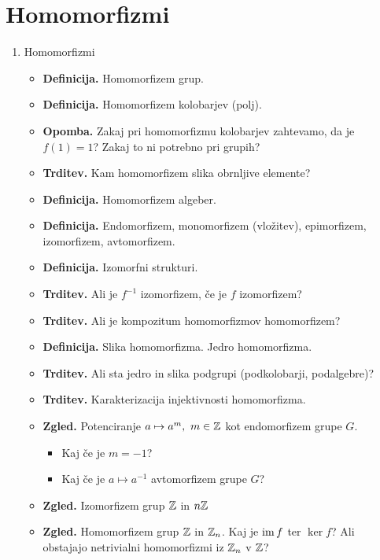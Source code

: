 \section{Homomorfizmi}

\begin{enumerate}
    \item Homomorfizmi
    \begin{itemize}
        \item \textbf{Definicija.} Homomorfizem grup.
        \item \textbf{Definicija.} Homomorfizem kolobarjev (polj).
        \item \textbf{Opomba.} Zakaj pri homomorfizmu kolobarjev zahtevamo, da je \(f(1) = 1\)? Zakaj to ni potrebno pri grupih? 
        \item \textbf{Trditev.} Kam homomorfizem slika obrnljive elemente?
        \item \textbf{Definicija.} Homomorfizem algeber.
        \item \textbf{Definicija.} Endomorfizem, monomorfizem (vložitev), epimorfizem, izomorfizem, avtomorfizem.
        \item \textbf{Definicija.} Izomorfni strukturi.
        \item \textbf{Trditev.} Ali je \(f^{-1}\) izomorfizem, če je \(f\) izomorfizem?
        \item \textbf{Trditev.} Ali je kompozitum homomorfizmov homomorfizem?
        \item \textbf{Definicija.} Slika homomorfizma. Jedro homomorfizma.
        \item \textbf{Trditev.} Ali sta jedro in slika podgrupi (podkolobarji, podalgebre)?
        \item \textbf{Trditev.} Karakterizacija injektivnosti homomorfizma.
        \item \textbf{Zgled.} Potenciranje \(a \mapsto a^m, \ m \in \mathbb{Z}\) kot endomorfizem grupe \(G\). 
        \begin{itemize}
            \item Kaj če je \(m = -1\)?
            \item Kaj če je \(a \mapsto a^{-1}\) avtomorfizem grupe \(G\)?
        \end{itemize}
        \item \textbf{Zgled.} Izomorfizem grup \(\mathbb{Z}\) in \(n\mathbb{Z}\)
        \item \textbf{Zgled.} Homomorfizem grup \(\mathbb{Z}\) in \(\mathbb{Z}_n\). Kaj je \(\operatorname{im} f\) ter \(\ker f\)? Ali obstajajo netrivialni homomorfizmi iz \(\mathbb{Z}_n\) v \(\mathbb{Z}\)?

\end{itemize}
\end{enumerate}
